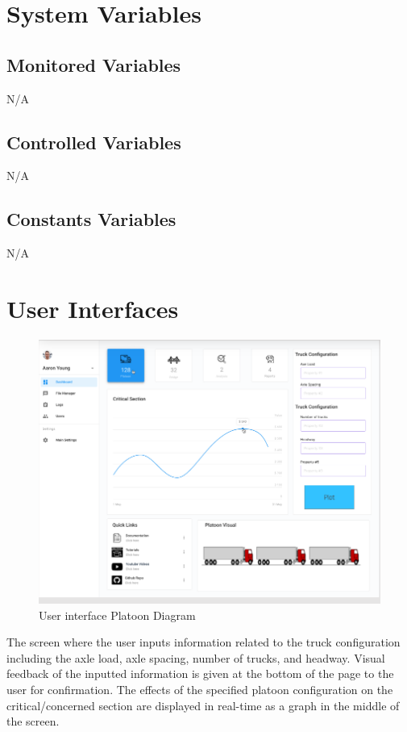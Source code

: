 \documentclass[12pt, titlepage]{article}
\begin{document}
\section{System Variables}

\subsection{Monitored Variables}
N/A
\subsection{Controlled Variables}
N/A
\subsection{Constants Variables}
N/A
\section{User Interfaces}
\begin{figure}[H]
  \centering
  \includegraphics[width=1\textwidth]{../images/Userinterface-Platoon.PNG}
  \caption{User interface Platoon Diagram}
  \label{fig:userinterface-platoon-diagram}
\end{figure}
The screen where the user inputs information related to the truck configuration including the axle load, axle spacing, number of trucks, and headway. Visual feedback of the inputted information is given at the bottom of the page to the user for confirmation. The effects of the specified platoon configuration on the critical/concerned section are displayed in real-time as a graph in the middle of the screen. \\\\
\end{document}
